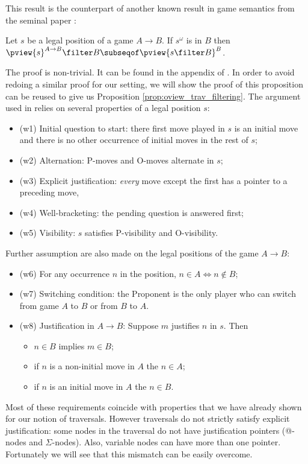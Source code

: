 This result is the counterpart of another known result in game semantics from the seminal paper \cite{hylandong_pcf}:
\begin{proposition}{\cite[Prop.4.3]{hylandong_pcf}}
\label{prop:hylandong_pviewprojection}
  Let $s$ be a legal position of a game $A\rightarrow B$.
  If $s^\omega$ is in $B$ then $\pview{s}^{A\rightarrow B} \filter B \subseqof \pview{s\filter B}^B$.
\end{proposition}
The proof is non-trivial. It can be found in the appendix of
\cite{hylandong_pcf}. In order to avoid redoing a similar proof for our setting,
we will show the proof of this proposition can be
reused to give us Proposition \ref{prop:oview_trav_filtering}. The argument used in
\cite{hylandong_pcf} relies on several properties of a legal position $s$:
\begin{itemize}
  \item (w1) Initial question to start: there first move played in $s$ is an initial move and there is no other occurrence of initial moves in the rest of $s$;
  \item(w2) Alternation: P-moves and O-moves alternate in $s$;
  \item(w3)  Explicit justification: \emph{every} move except the first has a pointer to a preceding move,
  \item(w4)  Well-bracketing: the pending question is answered first;
  \item(w5)  Visibility: $s$ satisfies P-visibility and
O-visibility.
\end{itemize}
Further assumption are also made on the legal positions of the game
$A\rightarrow B$:
\begin{itemize}
  \item(w6) For any occurrence $n$ in the position, $n \in A \iff n \not\in
B$;
  \item(w7) Switching condition: the Proponent is the only player
      who can switch from game $A$ to $B$ or from $B$ to $A$.
  \item(w8) Justification in $A\rightarrow B$: Suppose $m$ justifies $n$ in $s$. Then
    \begin{itemize}
        \item $n \in B$ implies $m\in B$;
        \item if $n$ is a non-initial move in $A$ the $n \in A$;
        \item if $n$ is an initial move in $A$ the $n \in B$.
    \end{itemize}
\end{itemize}
Most of these requirements coincide with properties that we have
already shown for our notion of traversals. However traversals do
not strictly satisfy explicit justification: some nodes in the
traversal do not have justification pointers (@-nodes and
$\Sigma$-nodes). Also, variable nodes can have more than one
pointer. Fortunately we will see that this mismatch can be easily
overcome.


